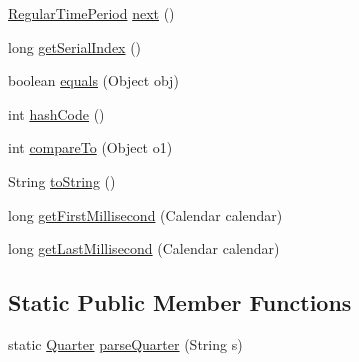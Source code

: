 \begin{DoxyCompactItemize}
\item 
\mbox{\hyperlink{classorg_1_1jfree_1_1data_1_1time_1_1_regular_time_period}{Regular\+Time\+Period}} \mbox{\hyperlink{classorg_1_1jfree_1_1data_1_1time_1_1_quarter_af173815c67598c0c4e8f12c3b180283d}{next}} ()
\item 
long \mbox{\hyperlink{classorg_1_1jfree_1_1data_1_1time_1_1_quarter_a7a831448676dd88964ff94e6d8fad032}{get\+Serial\+Index}} ()
\item 
boolean \mbox{\hyperlink{classorg_1_1jfree_1_1data_1_1time_1_1_quarter_ae5cee2e1b6f61afdf6db6dca97b9612b}{equals}} (Object obj)
\item 
int \mbox{\hyperlink{classorg_1_1jfree_1_1data_1_1time_1_1_quarter_a0143f30f3ec9df7425cd9812e3caf1dd}{hash\+Code}} ()
\item 
int \mbox{\hyperlink{classorg_1_1jfree_1_1data_1_1time_1_1_quarter_adf170bf15940fa2d995bab7db6ad9d28}{compare\+To}} (Object o1)
\item 
String \mbox{\hyperlink{classorg_1_1jfree_1_1data_1_1time_1_1_quarter_a785e838956e703a4d6758bbaf4b904e7}{to\+String}} ()
\item 
long \mbox{\hyperlink{classorg_1_1jfree_1_1data_1_1time_1_1_quarter_a14ab5d2abc2e777c3d5eb0f483a83f29}{get\+First\+Millisecond}} (Calendar calendar)
\item 
long \mbox{\hyperlink{classorg_1_1jfree_1_1data_1_1time_1_1_quarter_ac12112910ef4b05bb644edfd8fd12769}{get\+Last\+Millisecond}} (Calendar calendar)
\end{DoxyCompactItemize}
\subsection*{Static Public Member Functions}
\begin{DoxyCompactItemize}
\item 
static \mbox{\hyperlink{classorg_1_1jfree_1_1data_1_1time_1_1_quarter}{Quarter}} \mbox{\hyperlink{classorg_1_1jfree_1_1data_1_1time_1_1_quarter_a6f39909ecee3a8b8fdcb2740ec8f06bc}{parse\+Quarter}} (String s)
\end{DoxyCompactItemize}
